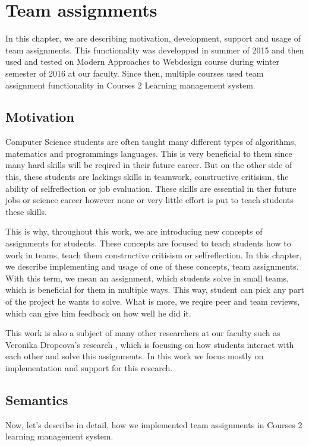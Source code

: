 \chapter{Team assignments}

In this chapter, we are describing motivation, development, support and usage of team assignments. This functionality was developped in summer of 2015 and then used and tested on Modern Approaches to Webdesign course during winter semester of 2016 at our faculty. Since then, multiple courses used team assignment functionality in Courses 2 Learning management system.

\section{Motivation}

Computer Science students are often taught many different types of algorithms, matematics and programmings languages. This is very beneficial to them since many hard skills will be reqired in their future career. But on the other side of this, these students are lackings skills in teamwork, constructive critisism, the ability of self\-reflection or job evaluation.  These skills are essential in ther future jobs or science career however none or very little effort is put to teach students these skills. 


This is why, throughout this work, we are introducing new concepts of assignments for students. These concepts are focused to teach students how to work in teams, teach them constructive critisism or self\-reflection. In this chapter, we describe implementing and usage of one of these concepts, team assignments. With this term, we mean an assignment, which students solve in small teams, which is beneficial for them in multiple ways. This way, student can pick any part of the project he wants to solve. What is more, we reqire peer and team reviews, which can give him feedback on how well he did it. 

This work is also a subject of many other researchers at our faculty such as Veronika Dropcova's research \cite{dropcova}, which is focusing on how students interact with each other and solve this assignments. In this work we focus mostly on implementation and support for this research.


\section{Semantics}
Now, let's describe in detail, how we implemented team assignments in Courses 2 learning management system.

